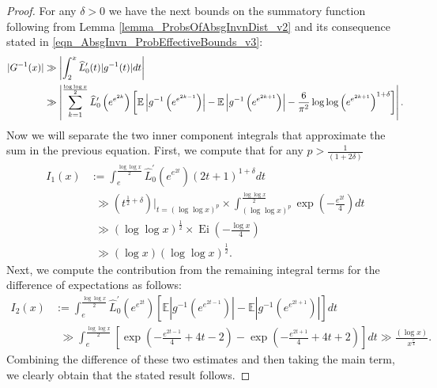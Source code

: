 \documentclass[11pt,reqno,a4letter]{article}
\numberwithin{figure}{section}
\numberwithin{table}{section}
\theoremstyle{plain}
\numberwithin{theorem}{section}
\theoremstyle{definition}
\begin{document}
\begin{proof}
For any $\delta > 0$ we have the next bounds on the summatory function 
following from Lemma \ref{lemma_ProbsOfAbsgInvnDist_v2} and its consequence stated in 
\eqref{eqn_AbsgInvn_ProbEffectiveBounds_v3}: 
\begin{align*} 
\notag 
|G^{-1}(x)| & \gg \left\lvert \int_2^x \widehat{L}_0^{\prime}(t) |g^{-1}(t)| dt \right\rvert \\ 
     & \gg \left\lvert \sum_{k=1}^{\frac{\log\log x}{2}} \widehat{L}_0^{\prime}\left(e^{e^{2k}}\right) \left[ 
     \mathbb{E}\left\lvert g^{-1}\left(e^{e^{2k-1}}\right) \right\rvert - 
     \mathbb{E}\left\lvert g^{-1}\left(e^{e^{2k+1}}\right) \right\rvert - 
     \frac{6}{\pi^2} \log\log\left(e^{e^{2k+1}}\right)^{1+\delta}  
     \right] \right\rvert. 
\end{align*} 
Now we will separate the two inner component integrals that approximate the 
sum in the previous equation. 
First, we compute that for any $p > \frac{1}{(1+2\delta)}$ 
\begin{align*} 
I_1(x) & := \int_{e}^{\frac{\log\log x}{2}} \widehat{L}_0^{\prime}\left(e^{e^{2t}}\right) 
     (2t+1)^{1+\delta} dt \\ 
     & \phantom{:} \gg \left(t^{\frac{1}{2}+\delta}\right) \Biggr\rvert_{t=(\log\log x)^{p}} \times 
     \int_{(\log\log x)^p}^{\frac{\log\log x}{2}} \exp\left(-\frac{e^{2t}}{4}\right) dt \\ 
     & \phantom{:} \gg (\log\log x)^{\frac{1}{2}} \times \operatorname{Ei}\left(-\frac{\log x}{4}\right) \\ 
     & \phantom{:} \gg (\log x) (\log\log x)^{\frac{1}{2}}. 
\end{align*} 
Next, we compute the contribution 
from the remaining integral terms for the difference of expectations as follows: 
\begin{align*} 
I_2(x) & := \int_{e}^{\frac{\log\log x}{2}} \widehat{L}_0^{\prime}\left(e^{e^{2t}}\right) \left[ 
     \mathbb{E}\left\lvert g^{-1}\left(e^{e^{2t-1}}\right) \right\rvert - 
     \mathbb{E}\left\lvert g^{-1}\left(e^{e^{2t+1}}\right) \right\rvert 
     \right] dt \\ 
     & \phantom{:} \gg 
     \int_{e}^{\frac{\log\log x}{2}} \left[\exp\left(-\frac{e^{2t-1}}{4} + 4t-2\right) - 
     \exp\left(-\frac{e^{2t+1}}{4} + 4t + 2\right) \right] dt \gg 
     \frac{(\log x)}{x^{\frac{e}{4}}}. 
\end{align*} 
Combining the difference of these two estimates and then taking the main term, we clearly obtain that 
the stated result follows. 
\end{proof} 
\end{document}
